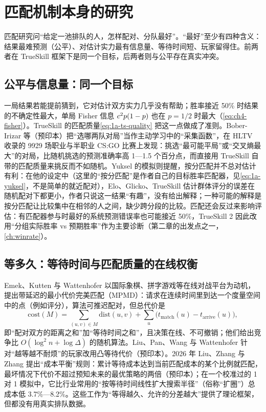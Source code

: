 \section{匹配机制本身的研究}\label{sec:1a-mm}

匹配研究问“给定一池排队的人，怎样配对、分队最好”。“最好”至少有四种含义：结果最难预测（公平）、对估计实力最有信息量、等待时间短、玩家留得住。前两者在 TrueSkill 框架下是同一个目标，后两者则与公平存在真实冲突。

\subsection{公平与信息量：同一个目标}\label{sec:1a-mm-info}

一局结果若能提前猜到，它对估计双方实力几乎没有帮助；胜率接近 50\% 时结果的不确定性最大，单局 Fisher 信息 $c^2p(1-p)$ 也在 $p=1/2$ 时最大（\cref{eq:ch4-fisher}）。TrueSkill 的匹配质量\cref{eq:1a-ts-quality} 把这一点做成了准则。Bober-Irizar 等（预印本）把“选哪两队对局”当作主动学习中的“采集函数”，在 HLTV 收录的 9929 场职业与半职业 CS:GO 比赛上发现：挑选“最可能平局”或“交叉熵最大”的对局，比随机挑选的预测准确率高 1—1.5 个百分点，而直接用 TrueSkill 自带的匹配质量来挑反而不如随机\cite{bober2024skill}\tagLit。Yuksel 的模拟则提醒，按分匹配并不总对估计有利：在他的设定中（这里的“按分匹配”是作者自己的目标胜率匹配器，见\cref{eq:1a-yuksel}，不是简单的就近配对），Elo、Glicko、TrueSkill 估计群体评分的误差在随机配对下都更小，作者只说这一结果“有趣”，没有给出解释\cite{yuksel2024skill}\tagLit；一种可能的解释是按分匹配让比较集中在相邻的人之间，缺少跨分段的比较\tagOwn。匹配还会反过来影响评估：有匹配器参与时最好的系统预测错误率也可能接近 50\%，TrueSkill 2 因此改用“分组实际胜率 vs 预期胜率”作为主要诊断（第二章的出发点之一，\cref{ch:winrate}）。

\subsection{等多久：等待时间与匹配质量的在线权衡}\label{sec:1a-mm-wait}

Emek、Kutten 与 Wattenhofer 以国际象棋、拼字游戏等在线对战平台为动机，提出带延迟的最小代价完美匹配（MPMD）：请求在连续时间里到达一个度量空间中的点（例如评分），算法可推迟配对，但总代价是
\begin{equation}\label{eq:1a-mpmd}
  \mathrm{cost}(M)=\sum_{(u,v)\in M} \mathrm{dist}(u,v) + \sum_{u} \big(t_{\text{match}}(u)-t_{\text{arrive}}(u)\big),
\end{equation}
即“配对双方的距离之和”加“等待时间之和”，且决策在线、不可撤销；他们给出竞争比 $O(\log^2 n+\log\Delta)$ 的随机算法\cite{emek2016online}\tagLit。Liu、Pan、Wang 与 Wattenhofer 针对“越等越不耐烦”的玩家改用凸等待代价（预印本）\cite{liu2022online}\tagLit。2026 年 Liu、Zhang 与 Zhang 提出“成本平衡”规则：累计等待成本达到当前匹配成本的某个比例就匹配，最坏情况下代价不超过预知未来的最优策略的两倍（预印本）\cite{liu2026when}\tagLit；在一个校准过的 1 对 1 模拟中，它比行业常用的“按等待时间线性扩大搜索半径”（俗称“扩圈”）总成本低 3.7\%—8.2\%。这些工作为“等得越久、允许的分差越大”提供了理论框架，但都没有用真实排队数据。

